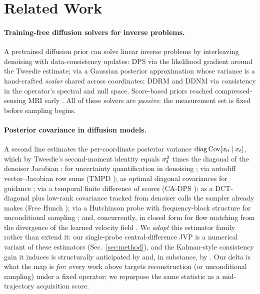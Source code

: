 \section{Related Work}
\label{sec:related}

\paragraph{Training-free diffusion solvers for inverse problems.}
A pretrained diffusion prior can solve linear inverse problems by interleaving
denoising with data-consistency updates: DPS \cite{chung2023dps} via the
likelihood gradient around the Tweedie estimate; \pigdm{} \cite{song2023pigdm}
via a Gaussian posterior approximation whose variance is a hand-crafted
\emph{scalar} shared across coordinates; DDRM \cite{kawar2022ddrm} and DDNM
\cite{wang2023ddnm} via consistency in the operator's spectral and null space.
Score-based priors reached compressed-sensing MRI early
\cite{jalal2021csgm,chung2022scoremri}. All of these solvers are
\emph{passive}: the measurement set is fixed before sampling begins.

\paragraph{Posterior covariance in diffusion models.}
A second line estimates the per-coordinate posterior variance
$\mathrm{diag}\,\mathrm{Cov}[x_0 \mid x_t]$, which by Tweedie's second-moment
identity equals $\sigma_t^2$ times the diagonal of the denoiser Jacobian
\cite{manor2024posterior,efron2011tweedie}: for uncertainty quantification in
denoising \cite{manor2024posterior}; via autodiff vector--Jacobian row sums
(TMPD \cite{boys2024tmpd}); as optimal diagonal covariances for guidance
\cite{peng2024covariance}; via a temporal finite difference of scores (CA-DPS
\cite{hamidi2024cadps}); as a DCT-diagonal plus low-rank covariance tracked
from denoiser calls the sampler already makes (Free Hunch
\cite{rissanen2025freehunch}); via a Hutchinson probe with frequency-block
structure for unconditional sampling \cite{schioppa2026covaware}; and,
concurrently, in closed form for flow matching from the divergence of the
learned velocity field \cite{divergence2026}. We \emph{adopt} this estimator
family rather than extend it: our single-probe central-difference JVP is a
numerical variant of these estimators (Sec.~\ref{sec:method}), and the
Kalman-style consistency gain it induces is structurally anticipated by
\pigdm{} and, in substance, by
\cite{peng2024covariance,hamidi2024cadps,rissanen2025freehunch}. Our delta is what the map is
\emph{for}: every work above targets reconstruction (or unconditional
sampling) under a fixed operator; we repurpose the same statistic as a
mid-trajectory acquisition score.

